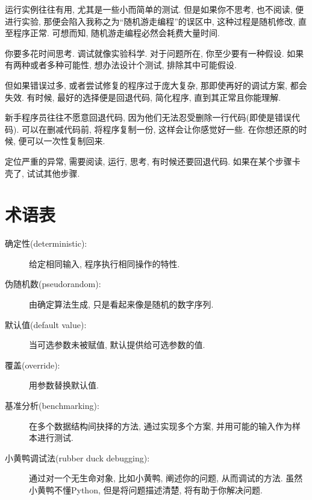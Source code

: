 \documentclass[10pt]{book}
\begin{document}
运行实例往往有用, 尤其是一些小而简单的测试. 但是如果你不思考, 也不阅读, 
便进行实验, 那便会陷入我称之为``随机游走编程''的误区中, 
这种过程是随机修改, 直至程序正常. 可想而知, 随机游走编程必然会耗费大量时间. 

你要多花时间思考. 
调试就像实验科学. 
对于问题所在, 你至少要有一种假设. 
如果有两种或者多种可能性, 想办法设计个测试, 排除其中可能假设. 

但如果错误过多, 或者尝试修复的程序过于庞大复杂, 
那即使再好的调试方案, 都会失效. 
有时候, 最好的选择便是回退代码, 简化程序, 直到其正常且你能理解. 

新手程序员往往不愿意回退代码, 因为他们无法忍受删除一行代码(即使是错误代码). 
可以在删减代码前, 将程序复制一份, 这样会让你感觉好一些. 
在你想还原的时候, 便可以一次性复制回来. 

定位严重的异常, 需要阅读, 运行, 思考, 有时候还要回退代码. 
如果在某个步骤卡壳了, 试试其他步骤. 


\section{术语表}

\begin{description}

\item[确定性(deterministic):] 给定相同输入, 程序执行相同操作的特性. 

\item[伪随机数(pseudorandom):] 由确定算法生成, 只是看起来像是随机的数字序列. 

\item[默认值(default value):] 当可选参数未被赋值, 默认提供给可选参数的值. 

\item[覆盖(override):] 用参数替换默认值. 

\item[基准分析(benchmarking):] 在多个数据结构间抉择的方法, 通过实现多个方案, 
并用可能的输入作为样本进行测试. 

\item[小黄鸭调试法(rubber duck debugging):] 通过对一个无生命对象, 比如小黄鸭, 阐述你的问题, 
从而调试的方法. 虽然小黄鸭不懂Python, 但是将问题描述清楚, 将有助于你解决问题. 

\end{description}
\end{document}
